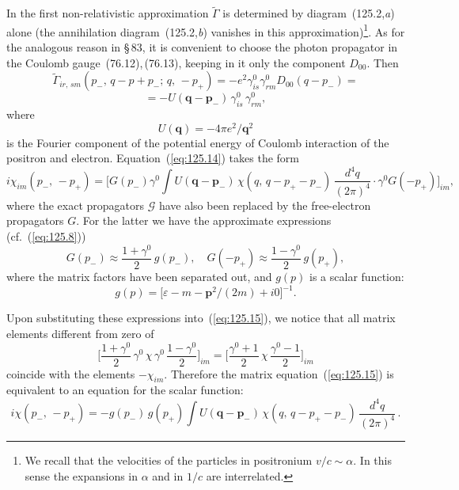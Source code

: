 In the first non-relativistic approximation $\widetilde{\Gamma}$ is determined by diagram~(125.2,\textit{a}) alone (the annihilation diagram~(125.2,\textit{b}) vanishes in this approximation)\footnote{We recall that the velocities of the particles in positronium $v/c \sim \alpha$. In this sense the expansions in $\alpha$ and in $1/c$ are interrelated.}. As for the analogous reason in \S\,83, it is convenient to choose the photon propagator in the Coulomb gauge~(76.12),\,(76.13), keeping in it only the component $D_{00}$. Then
\[
\widetilde{\Gamma}_{ir,\,sm}(p_-,\,q - p + p_-;\,q,\,-p_+) = -e^2\gamma^0_{is}\gamma^0_{rm} D_{00}(q - p_-) =
\]
\[
= -U(\mathbf{q} - \mathbf{p}_-)\,\gamma^0_{is}\,\gamma^0_{rm},
\]
where
\[
U(\mathbf{q}) = -4\pi e^2 / \mathbf{q}^2
\]
is the Fourier component of the potential energy of Coulomb interaction of the positron and electron. Equation~(\ref{eq:125.14}) takes the form
\begin{equation}
i\chi_{im}(p_-,\,-p_+) = \biggl[G(p_-)\gamma^0 \int U(\mathbf{q} - \mathbf{p}_-)\,\chi(q,\,q - p_+ - p_-)\,\frac{d^4 q}{(2\pi)^4} \cdot \gamma^0 G(-p_+)\biggr]_{im},
\label{eq:125.15}
\end{equation}
where the exact propagators $\mathcal{G}$ have also been replaced by the free-electron propagators $G$. For the latter we have the approximate expressions (cf.~(\ref{eq:125.8}))
\[
G(p_-) \approx \frac{1 + \gamma^0}{2}\,g(p_-), \quad G(-p_+) \approx \frac{1 - \gamma^0}{2}\,g(p_+),
\]
where the matrix factors have been separated out, and $g(p)$ is a scalar function:
\begin{equation}
g(p) = \bigl[\varepsilon - m - \mathbf{p}^2/(2m) + i0\bigr]^{-1}.
\label{eq:125.16}
\end{equation}


Upon substituting these expressions into~(\ref{eq:125.15}), we notice that all matrix elements different from zero of
\[
\biggl[\frac{1 + \gamma^0}{2}\,\gamma^0\,\chi\,\gamma^0\,\frac{1 - \gamma^0}{2}\biggr]_{im} = \biggl[\frac{\gamma^0 + 1}{2}\,\chi\,\frac{\gamma^0 - 1}{2}\biggr]_{im}
\]
coincide with the elements $-\chi_{im}$. Therefore the matrix equation~(\ref{eq:125.15}) is equivalent to an equation for the scalar function:
\begin{equation}
i\chi(p_-,\,-p_+) = -g(p_-)\,g(p_+) \int U(\mathbf{q} - \mathbf{p}_-)\,\chi(q,\,q - p_+ - p_-)\,\frac{d^4 q}{(2\pi)^4}\,.
\label{eq:125.17}
\end{equation}

